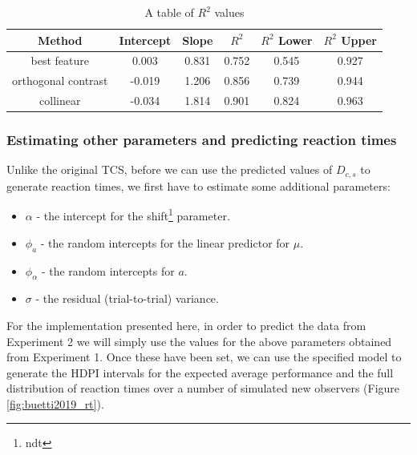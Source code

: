 \documentclass[smallextended, natbib]{svjour3}       %
\begin{document}
\begin{table}[h]
\centering
\begin{tabular}{ c|c|c|c|c|c } 
Method & Intercept & Slope & $R^2$ & $R^2$ Lower & $R^2$ Upper \\
 \hline 
best feature & 0.003 & 0.831 & 0.752 & 0.545 & 0.927\\ 
 orthogonal contrast & -0.019 & 1.206 & 0.856 & 0.739 & 0.944\\ 
 collinear & -0.034 & 1.814	& 0.901 & 0.824 & 0.963\\
\end{tabular}
\caption{A table of $R^2$ values}
\label{tab:reimp_D_r2}
\end{table}

\subsubsection{Estimating other parameters and predicting reaction times}

Unlike the original TCS, before we can use the predicted values of $D_{c,s}$ to generate reaction times, we first have to estimate some additional parameters: 

\begin{itemize}	
\item $\alpha$ - the intercept for the shift\footnote{ndt} parameter.
\item $\phi_a$ - the random intercepts for the linear predictor for $\mu$.
\item $\phi_\alpha$ - the random intercepts for $a$.
\item $\sigma$ - the residual (trial-to-trial) variance. 
\end{itemize}

For the implementation presented here, in order to predict the data from Experiment 2 we will simply use the values for the above parameters obtained from Experiment 1. Once these have been set, we can use the specified model to generate the HDPI intervals for the expected average performance and the full distribution of reaction times over a number of simulated new observers (Figure \ref{fig:buetti2019_rt}).
\end{document}
